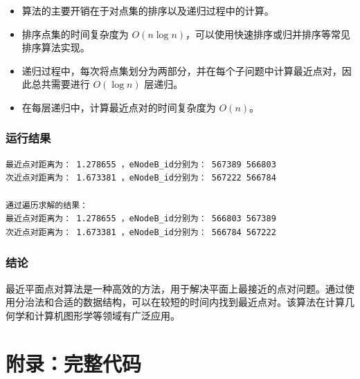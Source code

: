 \documentclass[lang=cn,11pt,a4paper]{elegantpaper}
\begin{document}
\begin{itemize}
  \item 算法的主要开销在于对点集的排序以及递归过程中的计算。
  \item 排序点集的时间复杂度为 $O(n \log n)$，可以使用快速排序或归并排序等常见排序算法实现。
  \item 递归过程中，每次将点集划分为两部分，并在每个子问题中计算最近点对，因此总共需要进行 $O(\log n)$ 层递归。
  \item 在每层递归中，计算最近点对的时间复杂度为 $O(n)$。
\end{itemize}

\clearpage

\subsubsection{运行结果}
\begin{lstlisting}[language=text]
最近点对距离为： 1.278655 ，eNodeB_id分别为： 567389 566803
次近点对距离为： 1.673381 ，eNodeB_id分别为： 567222 566784

通过遍历求解的结果：
最近点对距离为： 1.278655 ，eNodeB_id分别为： 566803 567389
次近点对距离为： 1.673381 ，eNodeB_id分别为： 566784 567222
\end{lstlisting}

\subsubsection{结论}
最近平面点对算法是一种高效的方法，用于解决平面上最接近的点对问题。通过使用分治法和合适的数据结构，可以在较短的时间内找到最近点对。该算法在计算几何学和计算机图形学等领域有广泛应用。

\section{附录：完整代码}
\end{document}
